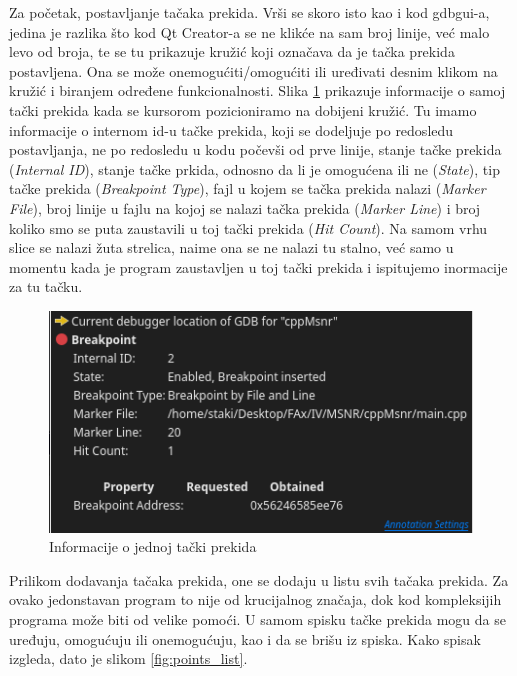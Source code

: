 \documentclass[a4paper]{article}
\begin{document}
Za početak, postavljanje tačaka prekida. Vrši se skoro isto kao i kod gdbgui-a, jedina je razlika što kod Qt Creator-a
se ne klikće na sam broj linije, već malo levo od broja, te se tu prikazuje kružić koji označava da je
tačka prekida postavljena. Ona se može onemogućiti/omogućiti ili uređivati desnim klikom na kružić i biranjem određene funkcionalnosti.
Slika \ref{fig:point_info} prikazuje informacije o samoj tački prekida kada se
kursorom pozicioniramo na dobijeni kružić. Tu imamo informacije o internom id-u tačke prekida, koji se dodeljuje
po redosledu postavljanja, ne po redosledu u kodu počevši od prve linije, stanje tačke prekida (\textit{Internal ID}),
stanje tačke prkida, odnosno da li je omogućena ili ne (\textit{State}), tip tačke prekida (\textit{Breakpoint Type}),
fajl u kojem se tačka prekida nalazi (\textit{Marker File}), broj linije u fajlu na kojoj se nalazi tačka prekida (\textit{Marker Line})
i broj koliko smo se puta zaustavili u toj tački prekida (\textit{Hit Count}).
Na samom vrhu slice se nalazi žuta strelica, naime ona se ne nalazi tu stalno, već samo u momentu kada je program 
zaustavljen u toj tački prekida i ispitujemo inormacije za tu tačku.

\begin{figure}[h!]
\begin{center}
\includegraphics[scale=0.7]{breakpoint_info.png}
\end{center}
\caption{Informacije o jednoj tački prekida}
\label{fig:point_info}
\end{figure}

Prilikom dodavanja tačaka prekida, one se dodaju u listu svih tačaka prekida. Za ovako jedonstavan program to 
nije od krucijalnog značaja, dok kod kompleksijih programa može biti od velike pomoći. U samom spisku tačke
prekida mogu da se uređuju, omogućuju ili onemogućuju, kao i da se brišu iz spiska. Kako spisak izgleda, dato 
je slikom \ref{fig:points_list}.
\end{document}

